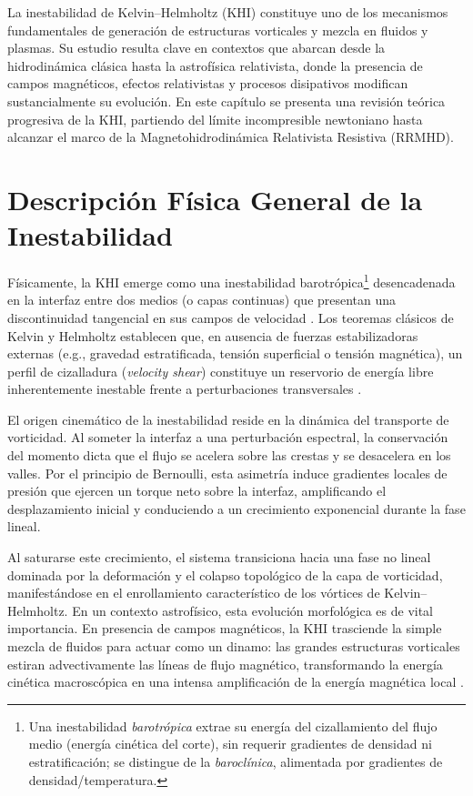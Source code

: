 \primerparrafo La inestabilidad de Kelvin--Helmholtz (KHI) constituye uno de los mecanismos fundamentales de generación de estructuras vorticales y mezcla en fluidos y plasmas. Su estudio resulta clave en contextos que abarcan desde la hidrodinámica clásica hasta la astrofísica relativista, donde la presencia de campos magnéticos, efectos relativistas y procesos disipativos modifican sustancialmente su evolución. En este capítulo se presenta una revisión teórica progresiva de la KHI, partiendo del límite incompresible newtoniano hasta alcanzar el marco de la Magnetohidrodinámica Relativista Resistiva (RRMHD).

\section{Descripción Física General de la Inestabilidad}

\primerparrafo Físicamente, la KHI emerge como una inestabilidad barotrópica\footnote{Una inestabilidad \emph{barotrópica} extrae su energía del cizallamiento del flujo medio (energía cinética del corte), sin requerir gradientes de densidad ni estratificación; se distingue de la \emph{baroclínica}, alimentada por gradientes de densidad/temperatura.} desencadenada en la interfaz entre dos medios (o capas continuas) que presentan una discontinuidad tangencial en sus campos de velocidad \parencite{gomes-2017, tian-2016}. Los teoremas clásicos de Kelvin y Helmholtz establecen que, en ausencia de fuerzas estabilizadoras externas (e.g., gravedad estratificada, tensión superficial o tensión magnética), un perfil de cizalladura (\textit{velocity shear}) constituye un reservorio de energía libre inherentemente inestable frente a perturbaciones transversales \parencite{acheson-1990}.

El origen cinemático de la inestabilidad reside en la dinámica del transporte de vorticidad. Al someter la interfaz a una perturbación espectral, la conservación del momento dicta que el flujo se acelera sobre las crestas y se desacelera en los valles. Por el principio de Bernoulli, esta asimetría induce gradientes locales de presión que ejercen un torque neto sobre la interfaz, amplificando el desplazamiento inicial y conduciendo a un crecimiento exponencial durante la fase lineal. 

Al saturarse este crecimiento, el sistema transiciona hacia una fase no lineal dominada por la deformación y el colapso topológico de la capa de vorticidad, manifestándose en el enrollamiento característico de los vórtices de Kelvin--Helmholtz. En un contexto astrofísico, esta evolución morfológica es de vital importancia. En presencia de campos magnéticos, la KHI trasciende la simple mezcla de fluidos para actuar como un dinamo: las grandes estructuras vorticales estiran advectivamente las líneas de flujo magnético, transformando la energía cinética macroscópica en una intensa amplificación de la energía magnética local \parencite{pimentel-2019}.

